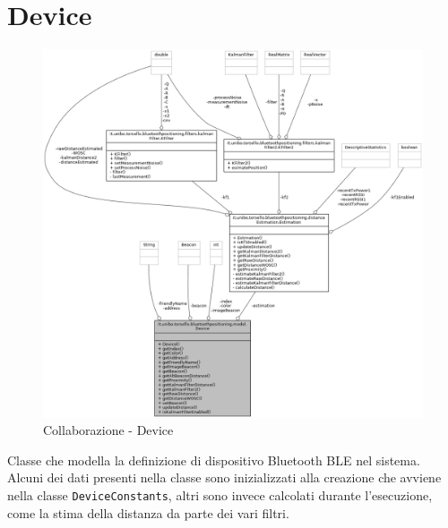 \newpage
\section{Device}
\begin{figure}[ph]
	\centering
	\includegraphics[width=0.9\linewidth]{img/uml/class/classit_1_1unibo_1_1torsello_1_1bluetoothpositioning_1_1model_1_1Device__coll__graph.png}
	\caption{Collaborazione - Device}
\end{figure}

Classe che modella la definizione di dispositivo Bluetooth BLE nel sistema. Alcuni dei dati presenti nella classe sono inizializzati alla creazione che avviene nella classe \texttt{DeviceConstants}, altri sono invece calcolati durante l'esecuzione, come la stima della distanza da parte dei vari filtri.

\newpage
